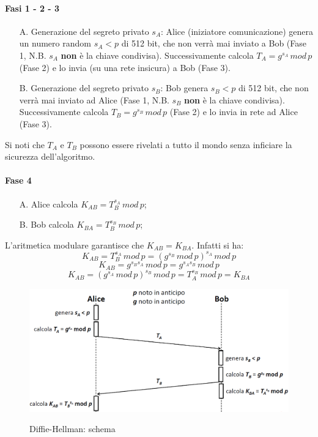 \paragraph{Fasi 1 - 2 - 3}
\begin{enumerate}
\item [A.] Generazione del segreto privato $s_{A}$: Alice (iniziatore comunicazione) genera un numero random $s_{A}<p$ di 512 bit, che non verrà mai inviato a Bob (Fase 1, N.B. $s_A$ \textbf{non} è la chiave condivisa). Successivamente calcola $T_{A}=g^{s_{A}} \, mod \,p$ (Fase 2) e lo invia (su una rete insicura) a Bob (Fase 3).
\item [B.] Generazione del segreto privato $s_{B}$: Bob genera $s_{B}<p$ di 512 bit, che non verrà mai inviato ad Alice (Fase 1, N.B. $s_B$ \textbf{non} è la chiave condivisa). Successivamente calcola $T_{B}=g^{s_{B}} \, mod \, p$ (Fase 2) e lo invia in rete ad Alice (Fase 3).
\end{enumerate}
Si noti che $T_A$ e $T_B$ possono essere rivelati a tutto il mondo senza inficiare la sicurezza dell'algoritmo.
\paragraph{Fase 4}
\begin{enumerate}
\item [A.] Alice calcola $K_{AB}=T_{B}^{s_{A}} \, mod \,p$;
\item [B.] Bob calcola $K_{BA}=T_{B}^{s_{B}} \, mod \, p$;
\end{enumerate}
L'aritmetica modulare garantisce che $K_{AB}=K_{BA}$. Infatti si ha:
\begin{equation}
K_{AB} = T_{B}^{s_{A}} \, mod \,p = ({g^{s_{B}} \, mod \, p})^{s_{A}} \, mod \,p
\end{equation}
\begin{equation}
K_{AB} = g^{s_{B}s_{A}} \, mod \, p = g^{s_{A}s_{B}} \, mod \, p
\end{equation} 
\begin{equation}
K_{AB} = ({g^{s_{A}} \, mod \, p})^{s_{B}} \, mod \,p = T_{A}^{s_{B}} \, mod \, p = K_{BA}
\end{equation}
\begin{figure}[htbp]
	\centering%
	\subfigure%
	{\includegraphics[scale=0.5, keepaspectratio]{Immagini/chiave_pubblica/DiffieHellman_schema.png}}
	\caption{Diffie-Hellman: schema}
\end{figure}

